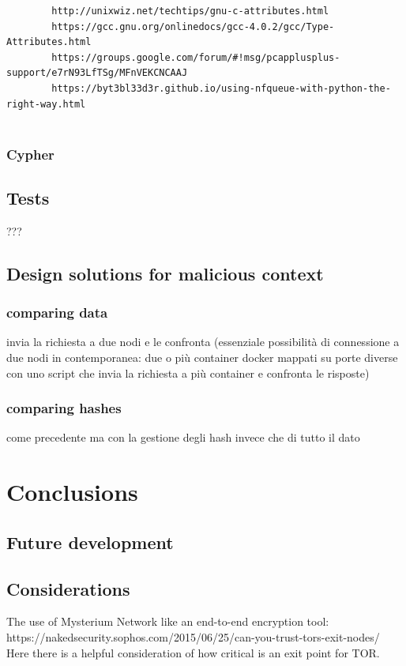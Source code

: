 \documentclass[12pt]{article}
\begin{document}
	\begin{verbatim}
		http://unixwiz.net/techtips/gnu-c-attributes.html
		https://gcc.gnu.org/onlinedocs/gcc-4.0.2/gcc/Type-Attributes.html
		https://groups.google.com/forum/#!msg/pcapplusplus-support/e7rN93LfTSg/MFnVEKCNCAAJ
		https://byt3bl33d3r.github.io/using-nfqueue-with-python-the-right-way.html
		
	\end{verbatim}

	\subsubsection{Cypher}


	\subsection{Tests}
		???
	\subsection{Design solutions for malicious context}
		\subsubsection{comparing data}
		invia la richiesta a due nodi e le confronta (essenziale possibilità di connessione a due nodi in contemporanea: due o più container docker mappati su porte diverse con uno script che invia la richiesta a più container e confronta le risposte)

		\subsubsection{comparing hashes}
		come precedente ma con la gestione degli hash invece che di tutto il dato
		
\section{Conclusions}
	\subsection{Future development}
	\subsection{Considerations}

	The use of Mysterium Network like an end-to-end encryption tool: https://nakedsecurity.sophos.com/2015/06/25/can-you-trust-tors-exit-nodes/
	Here there is a helpful consideration of how critical is an exit point for TOR.
\end{document}
